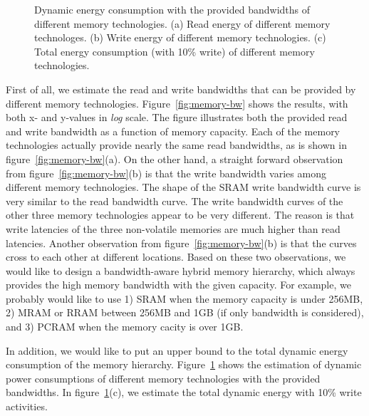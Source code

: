 \documentclass[12pt,letterpaper, singlecolumn]{article}
\begin{document}
\begin{large}
\begin{figure}[htbp]
\vspace*{-0.5in}
\hspace{0.02in}
\makebox[2in][l]{\textcolor [rgb]{0,0,0} {\bf (a)}}
\makebox[2in][l]{\textcolor [rgb]{0,0,0} {\bf (b)}}
\makebox[2in][l]{\textcolor [rgb]{0,0,0} {\bf (c)}}

\caption{Dynamic energy consumption with the provided bandwidths of different
  memory technologies. (a) Read energy of different memory technologes. (b)
  Write energy of different memory technologies. (c) Total energy consumption
  (with 10\% write) of different memory technologies.}
\label{fig:memory-energy}
\end{figure}

First of all, we estimate the read and write bandwidths that can be provided by
different memory technologies. Figure~\ref{fig:memory-bw} shows the results,
with both x- and y-values in \emph{log} scale. The figure illustrates both the
provided read and write bandwidth as a function of memory capacity. Each of the
memory technologies actually provide nearly the same read bandwidths, as is
shown in figure~\ref{fig:memory-bw}(a). On the other hand, a straight forward
observation from figure~\ref{fig:memory-bw}(b) is that the write bandwidth
varies among different memory technologies. The shape of the SRAM write
bandwidth curve is very similar to the read bandwidth curve. The write bandwidth
curves of the other three memory technologies appear to be very different. The
reason is that write latencies of the three non-volatile memories are much
higher than read latencies. Another observation from
figure~\ref{fig:memory-bw}(b) is that the curves cross to each other at
different locations. Based on these two observations, we would like to design a
bandwidth-aware hybrid memory hierarchy, which always provides the high memory
bandwidth with the given capacity. For example, we probably would like to use
1) SRAM when the memory capacity is under 256MB, 2) MRAM or RRAM between
256MB and 1GB (if only bandwidth is considered), and 3) PCRAM when the memory
cacity is over 1GB. 

In addition, we would like to put an upper bound to the total dynamic energy
consumption of the memory hierarchy. Figure~\ref{fig:memory-energy} shows the
estimation of dynamic power consumptions of different memory technologies with
the provided bandwidths. In figure~\ref{fig:memory-energy}(c), we estimate the total
dynamic energy with 10\% write activities.

% 



\end{large}
\end{document}
